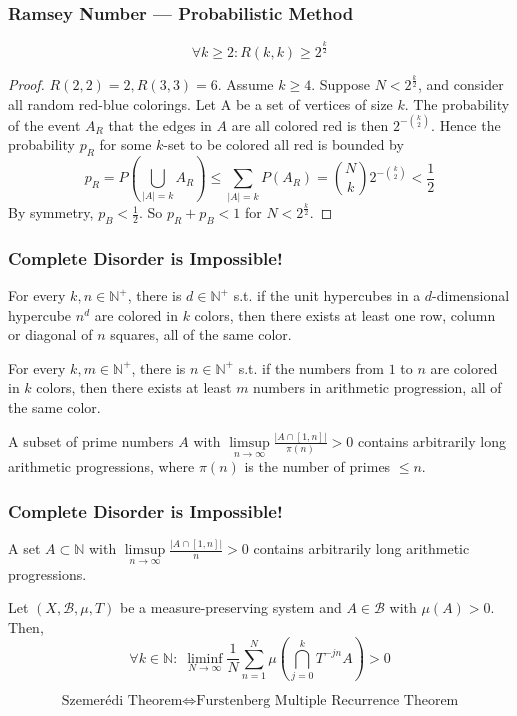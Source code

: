 \documentclass[UTF8,aspectratio=43,11pt,colorlinks,compress,openany]{beamer}%
\begin{document}
\begin{frame}\frametitle{Ramsey Number --- Probabilistic Method}
	\begin{theorem}		
		\[\forall k\geq 2: R(k,k)\geq 2^{\frac{k}{2}}\]
	\end{theorem}
	\begin{proof}
		$R(2,2)=2, R(3,3)=6$. Assume $k\geq 4$. Suppose $N<2^{\frac{k}{2}}$, and consider all random red-blue colorings. Let A be a set of vertices of size $k$. The probability of the event $A_R$ that the edges in $A$ are all colored red is then $2^{-\binom{k}{2}}$. Hence the probability $p_R$ for some $k$-set to be colored all red is bounded by
		\[p_R=P\left(\bigcup\limits_{|A|=k}A_R\right)\leq\sum\limits_{|A|=k}P(A_R)=\binom{N}{k}2^{-\binom{k}{2}}<\dfrac{1}{2}\]
		By symmetry, $p_B<\frac{1}{2}$. So $p_R+p_B<1$ for $N<2^{\frac{k}{2}}$.
	\end{proof}
\end{frame}

\begin{frame}\frametitle{Complete Disorder is Impossible!}
	\begin{theorem}
		For every $k,n\in\mathbb{N}^+$, there is $d\in\mathbb{N}^+$ s.t. if the unit hypercubes in a $d$-dimensional hypercube $n^d$ are colored in $k$ colors, then there exists at least one row, column or diagonal of $n$ squares, all of the same color.
	\end{theorem}
	\begin{theorem}
		For every $k,m\in\mathbb{N}^+$, there is $n\in\mathbb{N}^+$ s.t. if the numbers from $1$ to $n$ are colored in $k$ colors, then there exists at least $m$ numbers in arithmetic progression, all of the same color.
	\end{theorem}
	\begin{theorem}
		A subset of prime numbers $A$ with $\limsup\limits_{n\to\infty}\frac{|A\cap[1,n]|}{\pi(n)}>0$ contains arbitrarily long arithmetic progressions, where $\pi(n)$ is the number of primes $\leq n$.
	\end{theorem}
\end{frame}

\begin{frame}\frametitle{Complete Disorder is Impossible!}
\setlength\abovedisplayskip{0pt}
	\begin{theorem}
		A set $A\subset\mathbb{N}$ with $\limsup\limits_{n\to\infty}{\frac {|A\cap [1,n]|}{n}}>0$ contains arbitrarily long arithmetic progressions.
	\end{theorem}
	\begin{theorem}
		Let $(X,{\mathcal{B}},\mu,T)$ be a measure-preserving system and $A\in\mathcal{B}$ with $\mu(A) > 0$. Then,
		\[\forall k\in\mathbb{N}:\;\liminf\limits_{N\to\infty}\dfrac{1}{N}\sum\limits_{n=1}^N\mu\left(\bigcap\limits_{j=0}^k T^{-jn}A\right)>0\]
	\end{theorem}
	\[\text{Szemer\'edi Theorem}\iff\text{Furstenberg Multiple Recurrence Theorem}\]
\end{frame}
\end{document}
